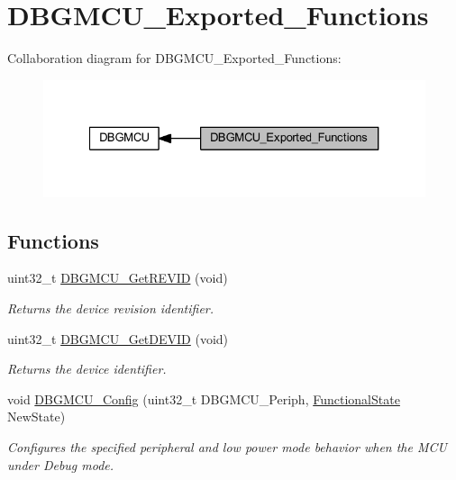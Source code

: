 \hypertarget{group___d_b_g_m_c_u___exported___functions}{}\section{D\+B\+G\+M\+C\+U\+\_\+\+Exported\+\_\+\+Functions}
\label{group___d_b_g_m_c_u___exported___functions}
Collaboration diagram for D\+B\+G\+M\+C\+U\+\_\+\+Exported\+\_\+\+Functions\+:
\nopagebreak
\begin{figure}[H]
\begin{center}
\leavevmode
\includegraphics[width=327pt]{group___d_b_g_m_c_u___exported___functions}
\end{center}
\end{figure}
\subsection*{Functions}
\begin{DoxyCompactItemize}
\item 
uint32\+\_\+t \hyperlink{group___d_b_g_m_c_u___exported___functions_ga47419e9ca75ab7be4c70feb82faa0511}{D\+B\+G\+M\+C\+U\+\_\+\+Get\+R\+E\+V\+ID} (void)
\begin{DoxyCompactList}\small\item\em Returns the device revision identifier. \end{DoxyCompactList}\item 
uint32\+\_\+t \hyperlink{group___d_b_g_m_c_u___exported___functions_gac34193c34dbce759bf424957a31b3266}{D\+B\+G\+M\+C\+U\+\_\+\+Get\+D\+E\+V\+ID} (void)
\begin{DoxyCompactList}\small\item\em Returns the device identifier. \end{DoxyCompactList}\item 
void \hyperlink{group___d_b_g_m_c_u___exported___functions_gadf2f267f855ac1e4c03905c5dcfbd28b}{D\+B\+G\+M\+C\+U\+\_\+\+Config} (uint32\+\_\+t D\+B\+G\+M\+C\+U\+\_\+\+Periph, \hyperlink{group___exported__types_gac9a7e9a35d2513ec15c3b537aaa4fba1}{Functional\+State} New\+State)
\begin{DoxyCompactList}\small\item\em Configures the specified peripheral and low power mode behavior when the M\+CU under Debug mode. \end{DoxyCompactList}\end{DoxyCompactItemize}


